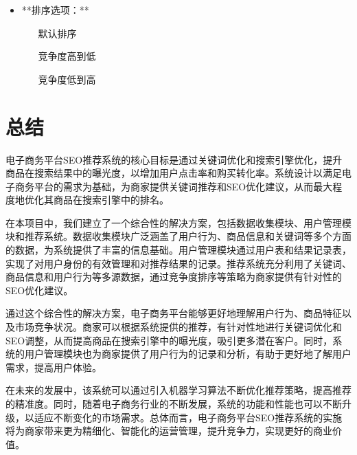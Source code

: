 \documentclass[11pt, a4paper, oneside]{ctexbook}
\begin{document}
\begin{itemize}
  \item **排序选项：**
   \begin{itemize}
    \item [默认排序]
    \item [竞争度高到低]
    \item [竞争度低到高]
  \end{itemize}
\end{itemize}
\chapter{总结}

电子商务平台SEO推荐系统的核心目标是通过关键词优化和搜索引擎优化，提升商品在搜索结果中的曝光度，以增加用户点击率和购买转化率。系统设计以满足电子商务平台的需求为基础，为商家提供关键词推荐和SEO优化建议，从而最大程度地优化其商品在搜索引擎中的排名。

在本项目中，我们建立了一个综合性的解决方案，包括数据收集模块、用户管理模块和推荐系统。数据收集模块广泛涵盖了用户行为、商品信息和关键词等多个方面的数据，为系统提供了丰富的信息基础。用户管理模块通过用户表和结果记录表，实现了对用户身份的有效管理和对推荐结果的记录。推荐系统充分利用了关键词、商品信息和用户行为等多源数据，通过竞争度排序等策略为商家提供有针对性的SEO优化建议。

通过这个综合性的解决方案，电子商务平台能够更好地理解用户行为、商品特征以及市场竞争状况。商家可以根据系统提供的推荐，有针对性地进行关键词优化和SEO调整，从而提高商品在搜索引擎中的曝光度，吸引更多潜在客户。同时，系统的用户管理模块也为商家提供了用户行为的记录和分析，有助于更好地了解用户需求，提高用户体验。

在未来的发展中，该系统可以通过引入机器学习算法不断优化推荐策略，提高推荐的精准度。同时，随着电子商务行业的不断发展，系统的功能和性能也可以不断升级，以适应不断变化的市场需求。总体而言，电子商务平台SEO推荐系统的实施将为商家带来更为精细化、智能化的运营管理，提升竞争力，实现更好的商业价值。
\end{document}
